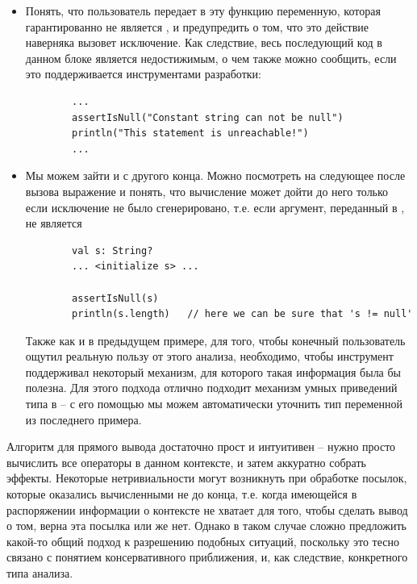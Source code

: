 \begin{itemize}
    \item Понять, что пользователь передает в эту функцию переменную, которая гарантированно не является , и предупредить о том, что это действие наверняка вызовет исключение. Как следствие, весь последующий код в данном блоке является недостижимым, о чем также можно сообщить, если это поддерживается инструментами разработки:
    
    \begin{verbatim}
        ...
        assertIsNull("Constant string can not be null")
        println("This statement is unreachable!")
        ...
    \end{verbatim}
    
    \item Мы можем зайти и с другого конца. Можно посмотреть на следующее после вызова выражение и понять, что вычисление может дойти до него только если исключение не было сгенерировано, т.е. если аргумент, переданный в , не является 
    
    \begin{verbatim}
        val s: String?
        ... <initialize s> ...
        
        assertIsNull(s)
        println(s.length)	// here we can be sure that 's != null'
    \end{verbatim}
    
    Также как и в предыдущем примере, для того, чтобы конечный пользователь ощутил реальную пользу от этого анализа, необходимо, чтобы инструмент поддерживал некоторый механизм, для которого такая информация была бы полезна. Для этого подхода отлично подходит механизм умных приведений типа в  -- с его помощью мы можем автоматически уточнить тип переменной  из последнего примера.
\end{itemize}

Алгоритм для прямого вывода достаточно прост и интуитивен -- нужно просто вычислить все операторы в данном контексте, и затем аккуратно собрать эффекты. Некоторые нетривиальности могут возникнуть при обработке посылок, которые оказались вычисленными не до конца, т.е. когда имеющейся в распоряжении информации о контексте не хватает для того, чтобы сделать вывод о том, верна эта посылка или же нет. Однако в таком случае сложно предложить какой-то общий подход к разрешению подобных ситуаций, поскольку это тесно связано с понятием консервативного приближения, и, как следствие, конкретного типа анализа.

